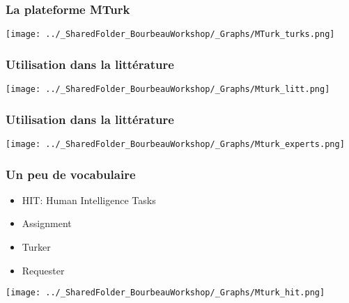 \documentclass{beamer}
\begin{document}

    \begin{frame}
    
      \frametitle{La plateforme MTurk} \vspace{1cm}

       \begin{center}
         \texttt{[image: ../\_SharedFolder\_BourbeauWorkshop/\_Graphs/MTurk\_turks.png]}
        \end{center} 
   
         
    \end{frame}  
    

    \begin{frame}
    
      \frametitle{Utilisation dans la littérature} \vspace{1cm}
      
       \begin{center}
         \texttt{[image: ../\_SharedFolder\_BourbeauWorkshop/\_Graphs/Mturk\_litt.png]}
        \end{center} 
   
         
    \end{frame}  
  
  

    \begin{frame}
    
      \frametitle{Utilisation dans la littérature} \vspace{1cm}
      
       \begin{center}
         \texttt{[image: ../\_SharedFolder\_BourbeauWorkshop/\_Graphs/Mturk\_experts.png]}
        \end{center} 
   
         
    \end{frame}  
    
    

    \begin{frame}
    
      \frametitle{Un peu de vocabulaire} \vspace{1cm}
      
       \begin{itemize}
          \item{HIT: Human Intelligence Tasks}
          \item{Assignment}
          \item{Turker}
          \item{Requester}
        \end{itemize}
   
   \begin{flushright}
     	    \texttt{[image: ../\_SharedFolder\_BourbeauWorkshop/\_Graphs/Mturk\_hit.png]}
    \end{flushright} 
         
    \end{frame}  
    
\end{document}
